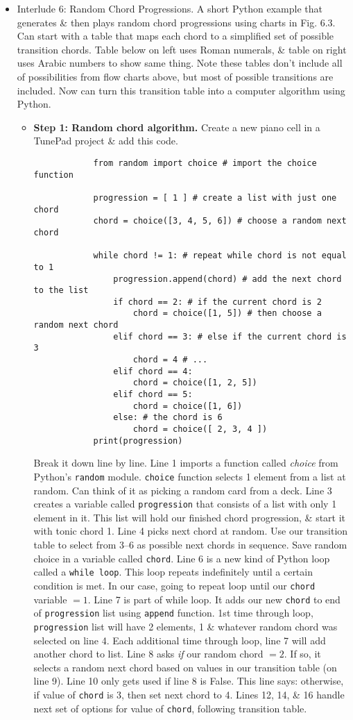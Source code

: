\documentclass{article}
\begin{document}
\begin{itemize}
\begin{itemize}
	\end{itemize}
	\item {\sf Interlude 6: Random Chord Progressions.} A short Python example that generates \& then plays random chord progressions using charts in {\sf Fig. 6.3}. Can start with a table that maps each chord to a simplified set of possible transition chords. Table below on left uses Roman numerals, \& table on right uses Arabic numbers to show same thing. Note these tables don't include all of possibilities from flow charts above, but most of possible transitions are included. Now can turn this transition table into a computer algorithm using Python.
	\begin{itemize}
		\item {\bf Step 1: Random chord algorithm.} Create a new piano cell in a TunePad project \& add this code.
		\begin{verbatim}
			from random import choice # import the choice function
			
			progression = [ 1 ] # create a list with just one chord
			chord = choice([3, 4, 5, 6]) # choose a random next chord
			
			while chord != 1: # repeat while chord is not equal to 1
			    progression.append(chord) # add the next chord to the list
			    if chord == 2: # if the current chord is 2
			        chord = choice([1, 5]) # then choose a random next chord
			    elif chord == 3: # else if the current chord is 3
			        chord = 4 # ...
			    elif chord == 4:
			        chord = choice([1, 2, 5])
			    elif chord == 5:
			        chord = choice([1, 6])
			    else: # the chord is 6
			        chord = choice([ 2, 3, 4 ])
			print(progression)
		\end{verbatim}
		Break it down line by line. Line 1 imports a function called {\it choice} from Python's {\tt random} module. {\tt choice} function selects 1 element from a list at random. Can think of it as picking a random card from a deck. Line 3 creates a variable called {\tt progression} that consists of a list with only 1 element in it. This list will hold our finished chord progression, \& start it with tonic chord 1. Line 4 picks next chord at random. Use our transition table to select from 3--6 as possible next chords in sequence. Save random choice in a variable called {\tt chord}. Line 6 is a new kind of Python loop called a {\tt while loop}. This loop repeats indefinitely until a certain condition is met. In our case, going to repeat loop until our {\tt chord} variable $= 1$. Line 7 is part of while loop. It adds our new {\tt chord} to end of {\tt progression} list using {\tt append} function. 1st time through loop, {\tt progression} list will have 2 elements, 1 \& whatever random chord was selected on line 4. Each additional time through loop, line 7 will add another chord to list. Line 8 asks {\it if} our random chord $= 2$. If so, it selects a random next chord based on values in our transition table (on line 9). Line 10 only gets used if line 8 is False. This line says: otherwise, if value of {\tt chord} is 3, then set next chord to 4. Lines 12, 14, \& 16 handle next set of options for value of {\tt chord}, following transition table.
		

\end{itemize}
\end{itemize}
\end{document}

